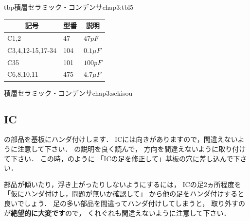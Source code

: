 \begin{mytable}{tbp}{積層セラミック・コンデンサ}{chap3:tbl5}
{\small\begin{tabular}{l|l|l}
\hline
\hline
\multicolumn{1}{c|}{記号} &
\multicolumn{1}{c|}{型番} &
\multicolumn{1}{c}{説明} \\
\hline
C1,2             &  47 & $  47 pF $    \\
C3,4,12-15,17-34 & 104 & $ 0.1 \mu F $ \\
C35              & 101 & $ 100 pF $    \\
C6,8,10,11       & 475 & $ 4.7 \mu F $ \\
\end{tabular}}
\end{mytable}

{積層セラミック・コンデンサ}{chap3:sekisou}

%
%

\subsection{IC}
の部品を基板にハンダ付けします．
ICには向きがありますので，間違えないように注意して下さい．
の説明を良く読んで，
方向を間違えないように取り付けて下さい．
この時，のように
「ICの足を修正して」基板の穴に差し込んで下さい．

部品が傾いたり，浮き上がったりしないようにするには，
ICの足2ヵ所程度を「仮にハンダ付けし，問題が無いか確認して」
から他の足をハンダ付けすると良いでしょう．
足の多い部品を間違ってハンダ付けしてしまうと，
取り外すのが{\bf 絶望的に大変です}ので，
くれぐれも間違えないように注意して下さい．

